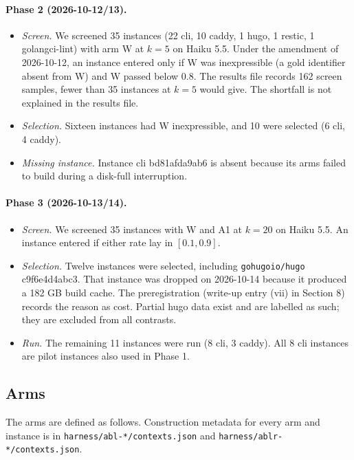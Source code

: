 \paragraph{Phase 2 (2026-10-12/13).}
\begin{itemize}
\item \emph{Screen.} We screened 35 instances (22 cli, 10 caddy, 1 hugo, 1 restic, 1 golangci-lint) with arm W at $k=5$ on Haiku 5.5. Under the amendment of 2026-10-12, an instance entered only if W was inexpressible (a gold identifier absent from W) and W passed below 0.8. The results file records 162 screen samples, fewer than 35 instances at $k=5$ would give. The shortfall is not explained in the results file.
\item \emph{Selection.} Sixteen instances had W inexpressible, and 10 were selected (6 cli, 4 caddy).
\item \emph{Missing instance.} Instance cli bd81afda9ab6 is absent because its arms failed to build during a disk-full interruption.
\end{itemize}

\paragraph{Phase 3 (2026-10-13/14).}
\begin{itemize}
\item \emph{Screen.} We screened 35 instances with W and A1 at $k=20$ on Haiku 5.5. An instance entered if either rate lay in $[0.1, 0.9]$.
\item \emph{Selection.} Twelve instances were selected, including \texttt{gohugoio/hugo} c9f6e4d4abc3. That instance was dropped on 2026-10-14 because it produced a 182 GB build cache. The preregistration (write-up entry (vii) in Section 8) records the reason as cost. Partial hugo data exist and are labelled as such; they are excluded from all contrasts.
\item \emph{Run.} The remaining 11 instances were run (8 cli, 3 caddy). All 8 cli instances are pilot instances also used in Phase 1.
\end{itemize}

\subsection{Arms}\label{sec:arms}

The arms are defined as follows. Construction metadata for every arm and instance is in \texttt{harness/abl-*/contexts.json} and \texttt{harness/ablr-*/contexts.json}.

